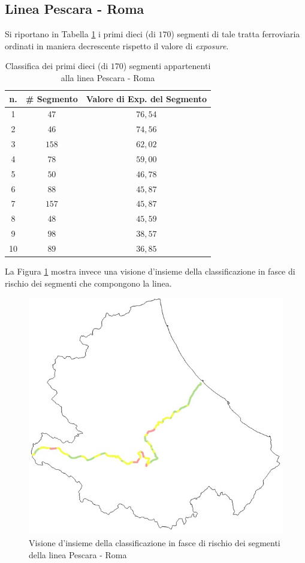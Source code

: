 \subsection{Linea Pescara - Roma}
Si riportano in Tabella \ref{classificapescararoma} i primi dieci (di $170$) segmenti di tale tratta ferroviaria ordinati in maniera decrescente rispetto il valore di \textit{exposure}.
\begin{table}[hpt]
\centering
\begin{tabular}{|c|c|c|}
\hline
\rowcolor{lightgray}
n. & \# Segmento & Valore di Exp. del Segmento \\ \hline \rowcolor{flamingopink}
1  & $47$        & $76,54$                      \\ \hline \rowcolor{flamingopink}
2  & $46$        & $74,56$                      \\ \hline \rowcolor{flamingopink}
3  & $158$        & $62,02$                      \\ \hline \rowcolor{flamingopink}
4  & $78$        & $59,00$                      \\ \hline \rowcolor{flamingopink}
5  & $50$        & $46,78$                      \\ \hline \rowcolor{flamingopink}
6  & $88$        & $45,87$                      \\ \hline \rowcolor{flamingopink}
7  & $157$       & $45,87$                      \\ \hline \rowcolor{flamingopink}
8  & $48$        & $45,59$                      \\ \hline \rowcolor{flamingopink}
9  & $98$        & $38,57$                      \\ \hline \rowcolor{flamingopink}
10 & $89$        & $36,85$                      \\ \hline
\end{tabular}
\caption{Classifica dei primi dieci (di $170$) segmenti appartenenti alla linea Pescara - Roma}
\label{classificapescararoma}
\end{table}
\newline
La Figura \ref{pescararoma} mostra invece una visione d'insieme della classificazione in fasce di rischio dei segmenti che compongono la linea.
\begin{figure}[hpt]
\centering
\includegraphics[width=0.4\linewidth]{img/romapescara.jpeg}
\caption{Visione d'insieme della classificazione in fasce di rischio dei segmenti della linea Pescara - Roma}
\label{pescararoma}
\end{figure}
